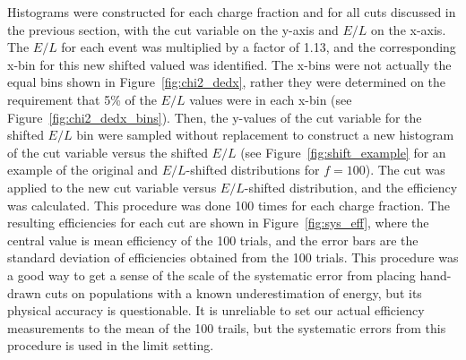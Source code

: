 Histograms were constructed for each charge fraction and for all cuts discussed in the previous section, with the cut variable on the y-axis and $E/L$ on the x-axis. The $E/L$ for each event was multiplied by a factor of 1.13, and the corresponding x-bin for this new shifted valued was identified. The x-bins were not actually the equal bins shown in Figure~\ref{fig:chi2_dedx}, rather they were determined on the requirement that 5\% of the $E/L$ values were in each x-bin (see Figure~\ref{fig:chi2_dedx_bins}). Then, the y-values of the cut variable for the shifted $E/L$ bin were sampled without replacement to construct a new histogram of the cut variable versus the shifted $E/L$ (see Figure~\ref{fig:shift_example} for an example of the original and $E/L$-shifted distributions for $f=100$). The cut was applied to the new cut variable versus $E/L$-shifted distribution, and the efficiency was calculated. This procedure was done 100 times for each charge fraction. The resulting efficiencies for each cut are shown in Figure~\ref{fig:sys_eff}, where the central value is mean efficiency of the 100 trials, and the error bars are the standard deviation of efficiencies obtained from the 100 trials. This procedure was a good way to get a sense of the scale of the systematic error from placing hand-drawn cuts on populations with a known underestimation of energy, but its physical accuracy is questionable. It is unreliable to set our actual efficiency measurements to the mean of the 100 trails, but the systematic errors from this procedure is used in the limit setting.

